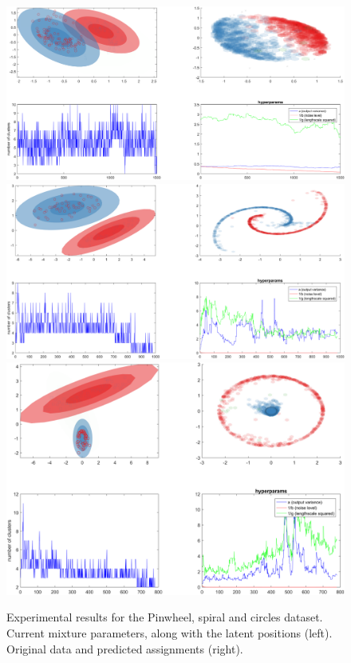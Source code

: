 \documentclass[]{article}
\begin{document}
\begin{figure}[ht!]
	\centering
	\includegraphics[width=0.9\linewidth]{img/mvwmmPW2arms100N}
		\includegraphics[width=0.9\linewidth]{img/mvwmmspiral}
				\includegraphics[width=0.9\linewidth]{img/mvwmmcircles2}
	\caption{Experimental results for the Pinwheel, spiral and circles dataset. Current mixture parameters, along with the latent positions (left). Original data and predicted assignments (right). }
\end{figure}
\end{document}

